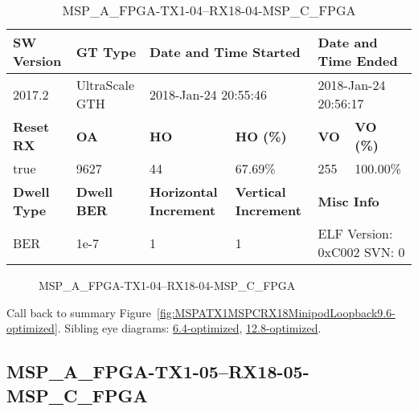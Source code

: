 \begin{table}[h]
\centering
\caption{MSP\_A\_FPGA-TX1-04--RX18-04-MSP\_C\_FPGA}
\label{tab:MSPAFPGATX104RX1804MSPCFPGA9.6-optimized}
\begin{tabular}{@{}|l|l|l|l|l|l|@{}}
\toprule
\textbf{SW Version}                & \textbf{GT Type}   & \multicolumn{2}{l|}{\textbf{Date and Time Started}}            & \multicolumn{2}{l|}{\textbf{Date and Time Ended}}        \\ \midrule
2017.2                       & UltraScale GTH          & \multicolumn{2}{l|}{2018-Jan-24 20:55:46}                   & \multicolumn{2}{l|}{2018-Jan-24 20:56:17}               \\ \midrule
\textbf{Reset RX}                  & \textbf{OA} & \textbf{HO}   & \textbf{HO (\%)} & \textbf{VO} & \textbf{VO (\%)} \\ \midrule
true & 9627        & 44          & 67.69\%        & 255        & 100.00\%       \\ \midrule
\textbf{Dwell Type}                & \textbf{Dwell BER} & \textbf{Horizontal Increment} & \textbf{Vertical Increment}    & \multicolumn{2}{l|}{\textbf{Misc Info}}                  \\ \midrule
BER                            & 1e-7        & 1        & 1           & \multicolumn{2}{l|}{ELF Version: 0xC002 SVN: 0}                         \\ \bottomrule
\end{tabular}
\end{table}

\begin{figure}[h]
\caption{MSP\_A\_FPGA-TX1-04--RX18-04-MSP\_C\_FPGA} \label{fig:MSPAFPGATX104RX1804MSPCFPGA9.6-optimized}
\end{figure}

Call back to summary Figure~\ref{fig:MSPATX1MSPCRX18MinipodLoopback9.6-optimized}.
Sibling eye diagrams: \hyperref[sec:MSPAFPGATX104RX1804MSPCFPGA6.4-optimized]{6.4-optimized}, \hyperref[sec:MSPAFPGATX104RX1804MSPCFPGA12.8-optimized]{12.8-optimized}.

\clearpage
\newpage


\subsection{MSP\_A\_FPGA-TX1-05--RX18-05-MSP\_C\_FPGA}\label{sec:MSPAFPGATX105RX1805MSPCFPGA9.6-optimized}


